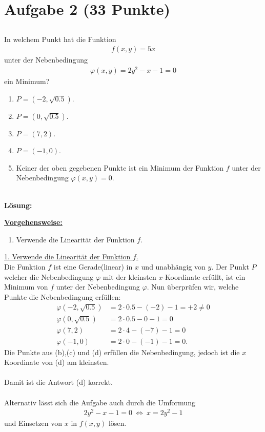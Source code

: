 \section*{Aufgabe 2 (33 Punkte)}
\vspace{0.4cm}
\subsection*{}
In welchem Punkt hat die Funktion
\begin{align*}
	f(x,y) = 5x
\end{align*}
unter der Nebenbedingung
\begin{align*}
	\varphi(x,y) = 2 y^2 - x - 1 = 0
\end{align*}
ein Minimum?
\renewcommand{\labelenumi}{(\alph{enumi})}
\begin{enumerate}
	\item $ P= (-2,\sqrt{0.5}) $.
	\item $ P= (0,\sqrt{0.5}) $.
	\item $ P= (7,2) $.
	\item $ P= (-1,0) $.
	\item Keiner der oben gegebenen Punkte ist ein Minimum der Funktion $ f $ unter der Nebenbedingung $ \varphi(x,y)= 0 $.
\end{enumerate}
\ \\
\textbf{Lösung:}
\begin{mdframed}
\underline{\textbf{Vorgehensweise:}}
\renewcommand{\labelenumi}{\theenumi.}
\begin{enumerate}
\item Verwende die Linearität der Funktion $ f $.
\end{enumerate}
\end{mdframed}

\underline{1. Verwende die Linearität der Funktion $ f $.}\\
Die Funktion $ f $ ist eine Gerade(linear) in $ x $ und unabhängig von $ y $.
Der Punkt $ P $ welcher die Nebenbedingung $ \varphi $ mit der kleinsten $ x $-Koordinate erfüllt, ist ein Minimum von $ f $ unter der Nebenbedingung $ \varphi $.
Nun überprüfen wir, welche Punkte die Nebenbedingung erfüllen:
\begin{align*}
	\varphi(-2,\sqrt{0.5})
	&=
	2 \cdot 0.5  - (-2)  -1 = +2  \neq 0\\
	\varphi(0,\sqrt{0.5})
	&=
	2 \cdot 0.5  - 0  -1 = 0\\
	\varphi(7,2)
	&=
	2 \cdot 4  - (-7)  -1 = 0\\
	\varphi(-1,0)
	&=
	2 \cdot 0  - (-1)  -1 = 0.
\end{align*}
Die Punkte aus (b),(c) und (d) erfüllen die Nebenbedingung, jedoch ist die $ x $ Koordinate von (d) am kleinsten.\\
\\
Damit ist die Antwort (d) korrekt.\\
\\
Alternativ lässt sich die Aufgabe auch durch die Umformung
\begin{align*}
	2y^2 - x -1  = 0
	\ \Leftrightarrow \
	x = 2 y^2 -1 
\end{align*}
und Einsetzen von $ x $ in $ f(x,y) $ lösen.


